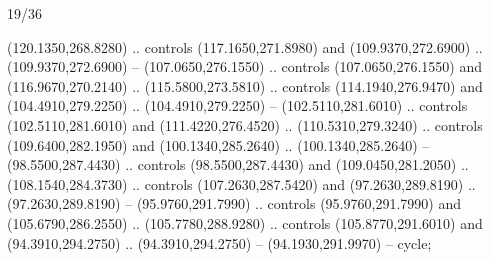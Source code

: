 \begin{flagdescription}{19/36}
\begin{scope}[yshift=\flagwidth/2,xshift=0.267\flagwidth,scale=\flagwidth/839]
\begin{scope}
{  (120.1350,268.8280) .. controls (117.1650,271.8980) and (109.9370,272.6900) ..
  (109.9370,272.6900) -- (107.0650,276.1550) .. controls (107.0650,276.1550) and
  (116.9670,270.2140) .. (115.5800,273.5810) .. controls (114.1940,276.9470) and
  (104.4910,279.2250) .. (104.4910,279.2250) -- (102.5110,281.6010) .. controls
  (102.5110,281.6010) and (111.4220,276.4520) .. (110.5310,279.3240) .. controls
  (109.6400,282.1950) and (100.1340,285.2640) .. (100.1340,285.2640) --
  (98.5500,287.4430) .. controls (98.5500,287.4430) and (109.0450,281.2050) ..
  (108.1540,284.3730) .. controls (107.2630,287.5420) and (97.2630,289.8190) ..
  (97.2630,289.8190) -- (95.9760,291.7990) .. controls (95.9760,291.7990) and
  (105.6790,286.2550) .. (105.7780,288.9280) .. controls (105.8770,291.6010) and
  (94.3910,294.2750) .. (94.3910,294.2750) -- (94.1930,291.9970) -- cycle;}
\begin{scope}\twig \end{scope}
\begin{scope}[shift={(238.5,0)},xscale=-1,yscale=1]\twig\end{scope}
\end{scope}
\end{scope}
\fi
\framecode{}
\end{flagdescription}
